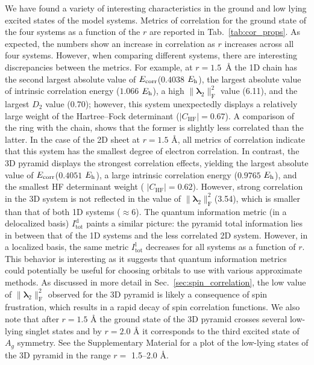 \documentclass[aip,jcp,amsmath,amssymb, reprint]{revtex4-1}
\newcommand*{\Eh}{$E_{\rm h}$\xspace}
\newcommand*{\Ecorr}{$E_{\rm{corr}}$\xspace}
\newcommand*{\RCMnorm}{$\norm{\pmb{\lambda}_{2}}^{2}_\mathrm{F}$\xspace}
\providecommand{\norm}[1]{\lVert#1\rVert}
\begin{document}
We have found a variety of interesting characteristics in the ground and low lying excited states of the  model systems.
Metrics of correlation for the ground state of the four  systems as a function of the $r$ are reported in Tab.~\ref{tab:cor_props}. 
As expected, the numbers show an increase in correlation as $r$ increases across all four systems. 
However, when comparing different systems, there are interesting discrepancies between the metrics. 
For example, at $r=1.5$~{\AA} the 1D  chain has the second largest absolute value of \Ecorr  ($0.4038$ \Eh), the largest absolute value of intrinsic correlation energy ($1.066$ \Eh), a high \RCMnorm value (6.11), and the largest $D_2$ value (0.70); however, this system unexpectedly displays a relatively large weight of the Hartree--Fock determinant  ($|C_\mathrm{HF}| = 0.67$).
A comparison of the ring with the chain, shows that the former is slightly less correlated than the latter.
In the case of the 2D sheet at $r = 1.5$ {\AA}, all metrics of correlation indicate that this system has the smallest degree of electron correlation.
In contrast, the 3D pyramid displays the strongest correlation effects, yielding the largest absolute value of \Ecorr  ($0.4051$ \Eh), a large intrinsic correlation energy ($0.9765$ \Eh), and the smallest HF determinant  weight ( $|C_\mathrm{HF}| = 0.62$).
However, strong correlation in the 3D system is not reflected in the value of \RCMnorm (3.54), which is smaller than that of both 1D systems ($\approx 6$).
The quantum information metric (in a delocalized basis) $I_{\text{tot}}^\mathrm{d}$ paints a similar picture: the pyramid total information lies in between that of the 1D systems and the less correlated 2D system. 
However, in a localized basis, the same metric $I_{\text{tot}}^\mathrm{l}$ decreases for all systems as a function of $r$.
This behavior is interesting as it suggests that quantum information metrics could potentially be useful for choosing orbitals to use with various approximate methods.
As discussed in more detail in Sec.~\ref{sec:spin_correlation}, the low value of \RCMnorm observed for the 3D pyramid is likely a consequence of spin frustration, which results in a rapid decay of spin correlation functions.
We also note that after $r = 1.5$ {\AA} the ground state of the 3D pyramid crosses several low-lying singlet states and by $r = 2.0$ {\AA} it corresponds to the third excited state of $A_g$ symmetry.
See the Supplementary Material for a plot of the low-lying states of the 3D pyramid in the range $r = $ 1.5--2.0 {\AA}.
\end{document}
